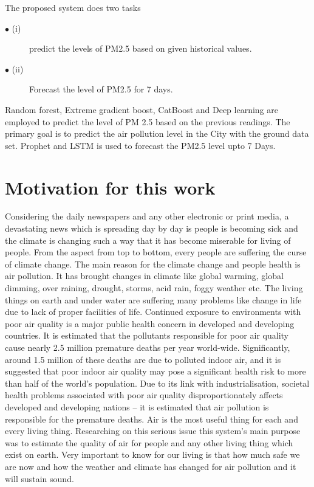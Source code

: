 The proposed system does two tasks
\begin{description}
  \item[$\bullet$ (i)]  predict the levels of PM2.5 based on given historical values.
  \item[$\bullet$ (ii)]   Forecast the level of PM2.5 for 7 days.
\end{description}
Random forest, Extreme gradient boost, CatBoost
and Deep learning are employed to predict the
level of PM 2.5 based on the previous readings.
The primary goal is to predict the air pollution
level in the City with the ground data set.
Prophet and LSTM is used to forecast the PM2.5 level upto 7 Days.


\section{Motivation for this work}

Considering the daily newspapers and any other electronic or print media, a devastating
news which is spreading day by day is people is becoming sick and the climate is changing such
a way that it has become miserable for living of people. From the aspect from top to bottom,
every people are suffering the curse of climate change. The main reason for the climate change
and people health is air pollution. It has brought changes in climate like global warming, global
dimming, over raining, drought, storms, acid rain, foggy weather etc. The living things on earth
and under water are suffering many problems like change in life due to lack of proper facilities
of life. 
Continued exposure to environments with poor air quality is a major public health concern in
developed and developing countries. It is estimated that the pollutants responsible for poor air
quality cause nearly 2.5 million premature deaths per year world-wide. Significantly, around 1.5
million of these deaths are due to polluted indoor air, and it is suggested that poor indoor air
quality may pose a significant health risk to more than half of the world’s population. Due to its
link with industrialisation, societal health problems associated with poor air quality
disproportionately affects developed and developing nations – it is estimated that air pollution is
responsible for the premature deaths. 
Air is the most useful thing for each and every living thing. Researching on this serious
issue this system’s main purpose was to estimate the quality of air for people and any other
living thing which exist on earth. Very important to know for our living is that how much safe
we are now and how the weather and climate has changed for air pollution and it will sustain
sound. \
